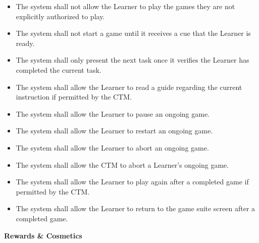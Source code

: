 \documentclass[12pt]{article}
\newcounter{reqnumG} %
\begin{document}
\noindent \begin{itemize}
  \setcounter{reqnumG}{0}

  \item[\refstepcounter{reqnumG}\thereqnumG \label{FR-PLAY-1}:] The system shall not allow the Learner to play the games they are not explicitly authorized to play.

  \item[\refstepcounter{reqnumG}\thereqnumG \label{FR-PLAY-2}:] The system shall not start a game until it receives a cue that the Learner is ready.

  \item[\refstepcounter{reqnumG}\thereqnumG \label{FR-PLAY-3}:] The system shall only present the next task once it verifies the Learner has completed the current task.

  \item[\refstepcounter{reqnumG}\thereqnumG \label{FR-PLAY-4}:] The system shall allow the Learner to read a guide regarding the current instruction if permitted by the CTM.

  \item[\refstepcounter{reqnumG}\thereqnumG \label{FR-PLAY-5}:] The system shall allow the Learner to pause an ongoing game.

  \item[\refstepcounter{reqnumG}\thereqnumG \label{FR-PLAY-6}:] The system shall allow the Learner to restart an ongoing game.

  \item[\refstepcounter{reqnumG}\thereqnumG \label{FR-PLAY-7}:] The system shall allow the Learner to abort an ongoing game.

  \item[\refstepcounter{reqnumG}\thereqnumG \label{FR-PLAY-8}:] The system shall allow the CTM to abort a Learner's ongoing game.

  \item[\refstepcounter{reqnumG}\thereqnumG \label{FR-PLAY-9}:] The system shall allow the Learner to play again after a completed game if permitted by the CTM.

  \item[\refstepcounter{reqnumG}\thereqnumG \label{FR-PLAY-10}:] The system shall allow the Learner to return to the game suite screen after a completed game.
\end{itemize}

\noindent \textbf{Rewards \& Cosmetics}
\end{document}
